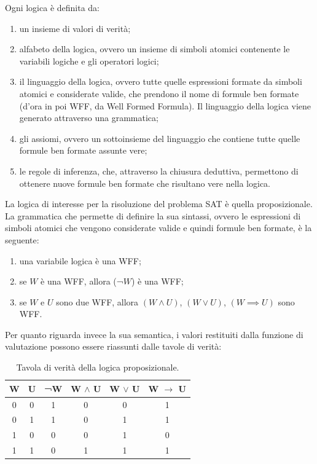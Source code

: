Ogni logica è definita da:
\begin{enumerate}
    \item un insieme di valori di verità;
    \item alfabeto della logica, ovvero un insieme di simboli atomici contenente le variabili logiche e gli operatori logici;
    \item il linguaggio della logica, ovvero tutte quelle espressioni formate da simboli atomici e considerate valide, che prendono il
    nome di formule ben formate (d'ora in poi WFF, da Well Formed Formula). Il linguaggio 
    della logica viene generato attraverso una grammatica;
    \item gli assiomi, ovvero un sottoinsieme del linguaggio che contiene tutte quelle formule ben formate assunte vere;
    \item le regole di inferenza, che, attraverso la chiusura deduttiva, permettono di ottenere nuove formule ben formate
    che risultano vere nella logica. 
\end{enumerate}
La logica di interesse per la risoluzione del problema SAT è quella proposizionale.
La grammatica che permette di definire la sua sintassi, ovvero le espressioni di simboli atomici che vengono considerate valide 
e quindi formule ben formate, è la seguente:
\begin{enumerate}
    \item una variabile logica è una WFF;
    \item se $W$ è una WFF, allora (¬$W$) è una WFF;
    \item se $W$ e $U$ sono due WFF, allora $(W \land U)$, $(W \lor U)$, $(W \implies U)$ sono WFF.
\end{enumerate}
Per quanto riguarda invece la sua semantica, i valori restituiti dalla funzione di valutazione possono essere riassunti dalle  tavole di verità:
\begin{table}[H]
\centering
\begin{tabular}{|c|c|c|c|c|c|}
\hline
W & U & ¬W & W $\land$ U & W $\lor$ U & W $\rightarrow$ U \\ \hline
0 & 0 & 1  & 0   & 0   & 1   \\ \hline
0 & 1 & 1  & 0   & 1   & 1   \\ \hline
1 & 0 & 0  & 0   & 1   & 0   \\ \hline
1 & 1 & 0  & 1   & 1   & 1   \\ \hline
\end{tabular}
\caption{Tavola di verità della logica proposizionale.}
\label{tab:truth_table}
\end{table}
